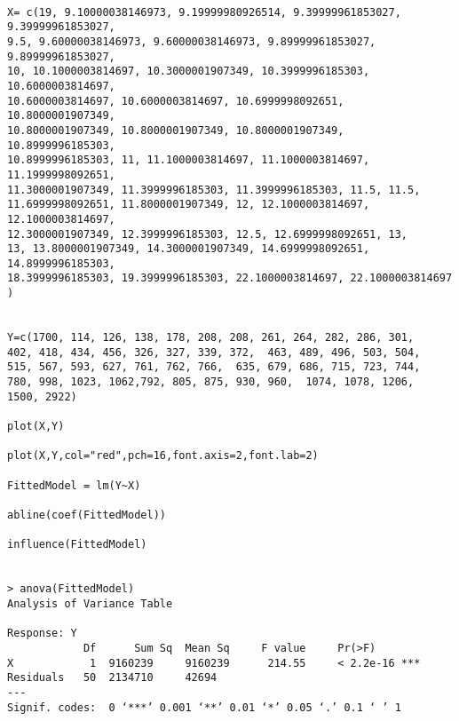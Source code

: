 \begin{verbatim}

X= c(19, 9.10000038146973, 9.19999980926514, 9.39999961853027, 9.39999961853027, 
9.5, 9.60000038146973, 9.60000038146973, 9.89999961853027, 9.89999961853027, 
10, 10.1000003814697, 10.3000001907349, 10.3999996185303, 10.6000003814697, 
10.6000003814697, 10.6000003814697, 10.6999998092651, 10.8000001907349, 
10.8000001907349, 10.8000001907349, 10.8000001907349, 10.8999996185303, 
10.8999996185303, 11, 11.1000003814697, 11.1000003814697, 11.1999998092651, 
11.3000001907349, 11.3999996185303, 11.3999996185303, 11.5, 11.5, 
11.6999998092651, 11.8000001907349, 12, 12.1000003814697, 12.1000003814697, 
12.3000001907349, 12.3999996185303, 12.5, 12.6999998092651, 13, 
13, 13.8000001907349, 14.3000001907349, 14.6999998092651, 14.8999996185303, 
18.3999996185303, 19.3999996185303, 22.1000003814697, 22.1000003814697
)


Y=c(1700, 114, 126, 138, 178, 208, 208, 261, 264, 282, 286, 301, 
402, 418, 434, 456, 326, 327, 339, 372,  463, 489, 496, 503, 504, 
515, 567, 593, 627, 761, 762, 766,  635, 679, 686, 715, 723, 744, 
780, 998, 1023, 1062,792, 805, 875, 930, 960,  1074, 1078, 1206, 
1500, 2922)

plot(X,Y)

plot(X,Y,col="red",pch=16,font.axis=2,font.lab=2)

FittedModel = lm(Y~X)

abline(coef(FittedModel))

influence(FittedModel)


> anova(FittedModel)
Analysis of Variance Table

Response: Y
          	Df  	Sum Sq 	Mean Sq 	F value    	Pr(>F)    
X         	 1 	9160239 	9160239 	 214.55 	< 2.2e-16 ***
Residuals 	50 	2134710   	42694                      
---
Signif. codes:  0 ‘***’ 0.001 ‘**’ 0.01 ‘*’ 0.05 ‘.’ 0.1 ‘ ’ 1 
\end{verbatim}

